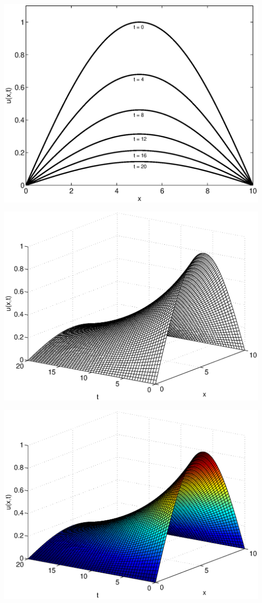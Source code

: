 \begin{solution}
\begin{enumerate}
        
      \begin{center}
           \includegraphics[scale=0.53]{checksol1}

           \includegraphics[scale=0.53]{checksol2}

           \includegraphics[scale=0.53]{checksol3}


\end{center}
\end{enumerate}
\end{solution}
